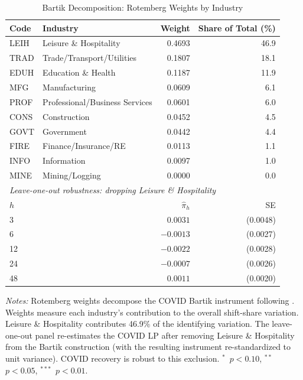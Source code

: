 \documentclass[12pt]{article}
\begin{document}
\begin{table}[H]
\centering
\caption{Bartik Decomposition: Rotemberg Weights by Industry}
\begin{threeparttable}
\small
\begin{tabular}{llrr}
\toprule
Code & Industry & Weight & Share of Total (\%) \\
\midrule
LEIH & Leisure \& Hospitality & 0.4693 & 46.9 \\
TRAD & Trade/Transport/Utilities & 0.1807 & 18.1 \\
EDUH & Education \& Health & 0.1187 & 11.9 \\
MFG & Manufacturing & 0.0609 & 6.1 \\
PROF & Professional/Business Services & 0.0601 & 6.0 \\
CONS & Construction & 0.0452 & 4.5 \\
GOVT & Government & 0.0442 & 4.4 \\
FIRE & Finance/Insurance/RE & 0.0113 & 1.1 \\
INFO & Information & 0.0097 & 1.0 \\
MINE & Mining/Logging & 0.0000 & 0.0 \\
\midrule
\multicolumn{4}{l}{\textit{Leave-one-out robustness: dropping Leisure \& Hospitality}} \\[3pt]
$h$ & & $\hat{\pi}_h$ & SE \\
3 & & $0.0031$ & (0.0048) \\
6 & & $-0.0013$ & (0.0027) \\
12 & & $-0.0022$ & (0.0028) \\
24 & & $-0.0007$ & (0.0026) \\
48 & & $0.0011$ & (0.0020) \\
\bottomrule
\end{tabular}
\begin{tablenotes}[flushleft]
\small
\item \textit{Notes:} Rotemberg weights decompose the COVID Bartik instrument following \citet{goldsmith2020bartik}. Weights measure each industry's contribution to the overall shift-share variation. Leisure \& Hospitality contributes 46.9\% of the identifying variation. The leave-one-out panel re-estimates the COVID LP after removing Leisure \& Hospitality from the Bartik construction (with the resulting instrument re-standardized to unit variance). COVID recovery is robust to this exclusion. $^{*}$~$p<0.10$, $^{**}$~$p<0.05$, $^{***}$~$p<0.01$.
\end{tablenotes}
\end{threeparttable}
\label{tab:rotemberg}
\end{table}
\end{document}

